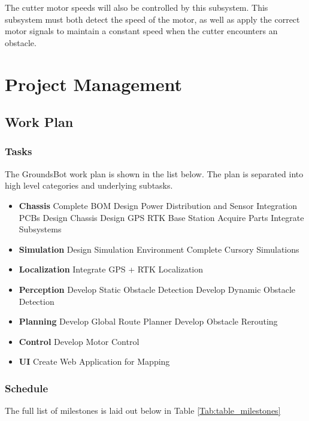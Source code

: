 \documentclass[12pt]{extarticle}
\begin{document}
      The cutter motor speeds will also be controlled by this subsystem. This subsystem must both detect the speed of the motor, as well as apply the correct motor signals to maintain a constant speed when the cutter encounters an obstacle. 

\newpage
\section{Project Management}
\subsection{Work Plan}
\subsubsection{Tasks}
The GroundsBot work plan is shown in the list below.  The plan is separated into high level categories and underlying subtasks. \\

\begin{itemize}
  \item [] \textbf{Chassis}
    \subitem Complete BOM
    \subitem Design Power Distribution and Sensor Integration PCBs %
    \subitem Design Chassis
    \subitem Design GPS RTK Base Station
    \subitem Acquire Parts
    \subitem Integrate Subsystems
  \item [] \textbf{Simulation}
    \subitem Design Simulation Environment
    \subitem Complete Cursory Simulations
  \item [] \textbf{Localization}
    \subitem Integrate GPS + RTK Localization
  \item [] \textbf{Perception}
    \subitem Develop Static Obstacle Detection
    \subitem Develop Dynamic Obstacle Detection
  \item [] \textbf{Planning}
    \subitem Develop Global Route Planner
    \subitem Develop Obstacle Rerouting
  \item [] \textbf{Control}
    \subitem Develop Motor Control
  \item [] \textbf{UI}
    \subitem Create Web Application for Mapping
\end{itemize}

   
\subsubsection{Schedule}
The full list of milestones is laid out below in Table \ref{Tab:table_milestones}\\ 
\end{document}
